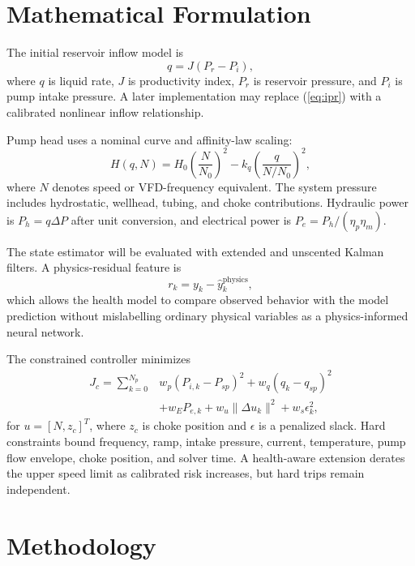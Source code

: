 \documentclass[conference]{IEEEtran}
\begin{document}
\section{Mathematical Formulation}
The initial reservoir inflow model is
\begin{equation}
q=J(P_r-P_i),
\label{eq:ipr}
\end{equation}
where $q$ is liquid rate, $J$ is productivity index, $P_r$ is reservoir pressure, and $P_i$ is pump intake pressure. A later implementation may replace (\ref{eq:ipr}) with a calibrated nonlinear inflow relationship.

Pump head uses a nominal curve and affinity-law scaling:
\begin{equation}
H(q,N)=H_0\left(\frac{N}{N_0}\right)^2
-k_q\left(\frac{q}{N/N_0}\right)^2,
\label{eq:pump}
\end{equation}
where $N$ denotes speed or VFD-frequency equivalent. The system pressure includes hydrostatic, wellhead, tubing, and choke contributions. Hydraulic power is $P_h=q\Delta P$ after unit conversion, and electrical power is $P_e=P_h/(\eta_p\eta_m)$.

The state estimator will be evaluated with extended and unscented Kalman filters. A physics-residual feature is
\begin{equation}
r_k=y_k-\hat{y}^{\mathrm{physics}}_k,
\label{eq:residual}
\end{equation}
which allows the health model to compare observed behavior with the model prediction without mislabelling ordinary physical variables as a physics-informed neural network.

The constrained controller minimizes
\begin{equation}
\begin{split}
J_c=\sum_{k=0}^{N_p} & w_p(P_{i,k}-P_{sp})^2+w_q(q_k-q_{sp})^2 \\
& +w_E P_{e,k}+w_u\|\Delta u_k\|^2+w_s\epsilon_k^2,
\end{split}
\label{eq:mpc}
\end{equation}
for $u=[N,z_c]^T$, where $z_c$ is choke position and $\epsilon$ is a penalized slack. Hard constraints bound frequency, ramp, intake pressure, current, temperature, pump flow envelope, choke position, and solver time. A health-aware extension derates the upper speed limit as calibrated risk increases, but hard trips remain independent.

\section{Methodology}
\end{document}
